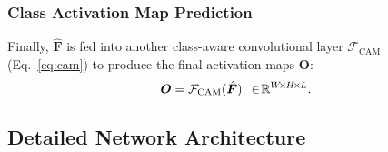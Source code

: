 \documentclass[10pt,twocolumn,letterpaper]{article}
\begin{document}
\subsubsection{Class Activation Map Prediction}
Finally, $\hat{\bm{F}}$ is fed into another class-aware convolutional layer $\mathcal{F}_{\text{CAM}}$  (Eq.~\ref{eq:cam}) to produce the final activation maps $\bm{O}$:
\vspace{-3pt}
\begin{equation}\small\label{eq:o}
 \bm{O}=\mathcal{F}_{\text{CAM}}(\hat{\bm{F}})~~\!\in\!\mathbb{R}^{W_{\!}\times_{\!} H_{\!}\times_{\!} L}.
 \vspace{-1pt}
\end{equation}



\subsection{Detailed Network Architecture}\label{sec:arch}
\end{document}
